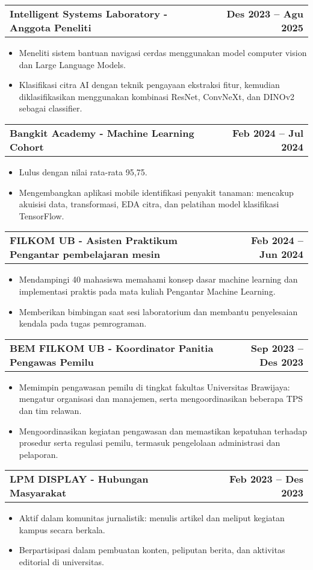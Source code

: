 \documentclass[a4paper,12pt]{article}
\makeatletter
\newenvironment{joblong}[2]
    {
    \begin{tabularx}{\linewidth}{@{}l X r@{}}
    \textbf{#1} & \hfill &  #2 \\[3.75pt]
    \end{tabularx}
    \begin{minipage}[t]{\linewidth}
    \begin{itemize}[nosep,after=\strut, leftmargin=1em, itemsep=3pt,label=--]
    }
    {
    \end{itemize}
    \end{minipage}    
    }
\makeatother
\begin{document}
\begin{joblong}{Intelligent Systems Laboratory - Anggota Peneliti}{\textbf{Des 2023 -- Agu 2025}}
\item Meneliti sistem bantuan navigasi cerdas menggunakan model computer vision dan Large Language Models.
\item Klasifikasi citra AI dengan teknik pengayaan ekstraksi fitur, kemudian diklasifikasikan menggunakan kombinasi ResNet, ConvNeXt, dan DINOv2 sebagai classifier.
\end{joblong}

\begin{joblong}{Bangkit Academy - Machine Learning Cohort}{\textbf{Feb 2024 -- Jul 2024}}
\item Lulus dengan nilai rata-rata 95{,}75.
\item Mengembangkan aplikasi mobile identifikasi penyakit tanaman: mencakup akuisisi data, transformasi, EDA citra, dan pelatihan model klasifikasi TensorFlow.
\end{joblong}

\begin{joblong}{FILKOM UB - Asisten Praktikum Pengantar pembelajaran mesin}{\textbf{Feb 2024 -- Jun 2024}}
\item Mendampingi 40 mahasiswa memahami konsep dasar machine learning dan implementasi praktis pada mata kuliah Pengantar Machine Learning.
\item Memberikan bimbingan saat sesi laboratorium dan membantu penyelesaian kendala pada tugas pemrograman.
\end{joblong}

\begin{joblong}{ BEM FILKOM UB - Koordinator Panitia Pengawas Pemilu }{\textbf{Sep 2023 -- Des 2023}}
\item Memimpin pengawasan pemilu di tingkat fakultas Universitas Brawijaya: mengatur organisasi dan manajemen, serta mengoordinasikan beberapa TPS dan tim relawan.
\item Mengoordinasikan kegiatan pengawasan dan memastikan kepatuhan terhadap prosedur serta regulasi pemilu, termasuk pengelolaan administrasi dan pelaporan.
\end{joblong}

\begin{joblong}{LPM DISPLAY - Hubungan Masyarakat}{\textbf{Feb 2023 -- Des 2023}}
\item Aktif dalam komunitas jurnalistik: menulis artikel dan meliput kegiatan kampus secara berkala.
\item Berpartisipasi dalam pembuatan konten, peliputan berita, dan aktivitas editorial di universitas.
\end{joblong}
\end{document}

